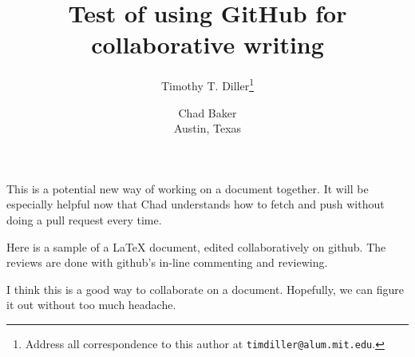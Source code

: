 \documentclass[10pt,a4paper]{article}
\title{Test of using GitHub for collaborative writing}
\author{Timothy T. Diller\thanks{Address all correspondence to this
    author at \texttt{timdiller@alum.mit.edu}.} \and Chad Baker\\Austin, Texas}
\begin{document}
\maketitle
This is a potential new way of working on a document together.  It
will be especially helpful now that Chad understands how to fetch and
push without doing a pull request every time.  

Here is a sample of a \LaTeX{} document, edited collaboratively on github.
The reviews are done with github's in-line commenting and reviewing.

I think this is a good way to collaborate on a document. Hopefully, we
can figure it out without too much headache. 
\end{document}
